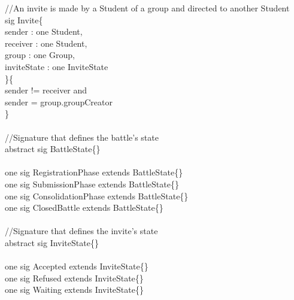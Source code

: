 \documentclass{article}
\begin{document}
{\noindent
\color{gray}
//An invite is made by a Student of a group and directed to another Student\\
\color{blue}
sig
\color{black}
Invite\{\\
\-\hspace{1cm}    sender : \color{blue} one \color{black} Student,\\
\-\hspace{1cm}    receiver : \color{blue} one \color{black} Student,\\
\-\hspace{1cm}    group : \color{blue} one \color{black} Group,\\
\-\hspace{1cm}	inviteState : \color{blue} one \color{black} InviteState\\
\}\{\\
\-\hspace{1cm}    sender \color{blue} != \color{black} receiver \color{blue} and \color{black}\\
\-\hspace{1cm}    sender \color{blue} = \color{black} group.groupCreator \\
\}\\
\\
\color{gray}
//Signature that defines the battle's state\\
\color{blue} abstract sig \color{black} BattleState\{\}\\
\\
\color{blue} one sig \color{black}  RegistrationPhase \color{blue} extends \color{black} BattleState\{\}\\
\color{blue} one sig \color{black}  SubmissionPhase \color{blue} extends \color{black} BattleState\{\}\\
\color{blue} one sig \color{black}  ConsolidationPhase \color{blue} extends \color{black} BattleState\{\}\\
\color{blue} one sig \color{black}  ClosedBattle \color{blue} extends \color{black} BattleState\{\}\\
\\
\color{gray}
//Signature that defines the invite's state\\
\color{blue} abstract sig \color{black} InviteState\{\}\\
\\
\color{blue} one sig \color{black} Accepted \color{blue} extends \color{black} InviteState\{\}\\
\color{blue} one sig \color{black} Refused \color{blue} extends \color{black} InviteState\{\}\\
\color{blue} one sig \color{black} Waiting \color{blue} extends \color{black} InviteState\{\}\\
\\
}
\end{document}
